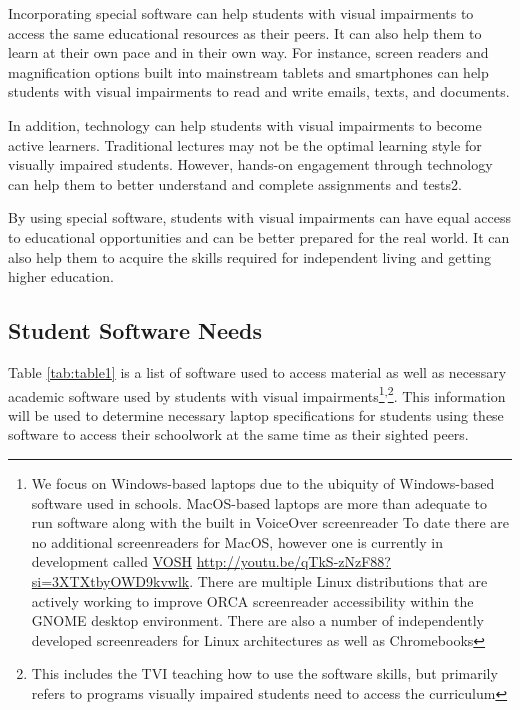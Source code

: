\documentclass[12pt,letterpaper,twoside,openright]{report}
\newcommand\fnsep{\textsuperscript{,}}
\begin{document}
Incorporating special software can help students with visual impairments to access the same educational resources as their peers. It can also help them to learn at their own pace and in their own way. For instance, screen readers and magnification options built into mainstream tablets and smartphones can help students with visual impairments to read and write emails, texts, and documents.

In addition, technology can help students with visual impairments to become active learners. Traditional lectures may not be the optimal learning style for visually impaired students. However, hands-on engagement through technology can help them to better understand and complete assignments and tests2.

By using special software, students with visual impairments can have equal access to educational opportunities and can be better prepared for the real world. It can also help them to acquire the skills required for independent living and getting higher education.

\pagebreak\hypertarget{student-software-needs}{}\subsection{Student Software Needs}\label{student-software-needs}
Table \ref{tab:table1} is a list of software used to access material as well as necessary academic software used by students with visual impairments\footnote{\raggedright We focus on Windows-based laptops due to the ubiquity of Windows-based software used in schools. MacOS-based laptops are more than adequate to run software along with the built in VoiceOver screenreader  To date there are no additional screenreaders for MacOS, however one is currently in development called \href{http://youtu.be/qTkS-zNzF88?si=3XTXtbyOWD9kvwlk}{VOSH} \url{http://youtu.be/qTkS-zNzF88?si=3XTXtbyOWD9kvwlk}. There are multiple Linux distributions that are actively working to improve ORCA screenreader accessibility within the GNOME desktop environment. There are also a number of independently developed screenreaders for Linux architectures as well as Chromebooks}\fnsep\footnote{\raggedright This includes the TVI teaching how to use the software skills, but primarily refers to programs visually impaired students need to access the curriculum}. This information will be used to determine necessary laptop specifications for students using these software to access their schoolwork at the same time as their sighted peers.
\end{document}
